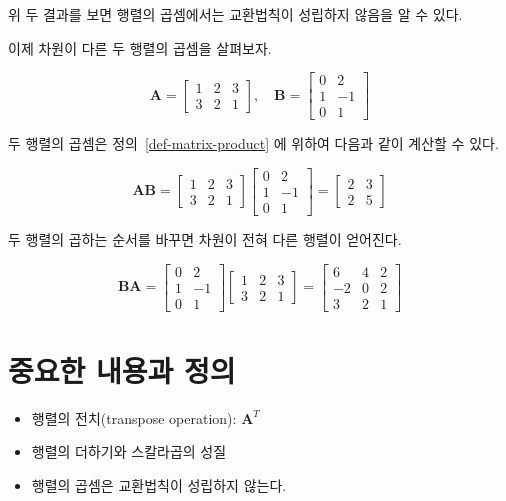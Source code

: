 \documentclass[
  11pt,
  a4paper,
  oneside]{scrbook}
\theoremstyle{definition}
\theoremstyle{definition}
\theoremstyle{plain}
\theoremstyle{remark}
\begin{document}
위 두 결과를 보면 행렬의 곱셈에서는 교환법칙이 성립하지 않음을 알 수
있다.

이제 차원이 다른 두 행렬의 곱셈을 살펴보자.

\[
\pmb A =
\begin{bmatrix}
1 & 2 & 3\\
3 & 2 & 1
\end{bmatrix},
\quad
\pmb B =
\begin{bmatrix}
0 & 2 \\
1 & -1 \\
0 & 1
\end{bmatrix}
\]

두 행렬의 곱셈은 정의~\ref{def-matrix-product} 에 위하여 다음과 같이
계산할 수 있다.

\[
\pmb A \pmb B =
\begin{bmatrix}
1 & 2 & 3\\
3 & 2 & 1
\end{bmatrix}
\begin{bmatrix}
0 & 2 \\
1 & -1 \\
0 & 1
\end{bmatrix}
=
\begin{bmatrix}
2 & 3 \\
2 & 5
\end{bmatrix}
\]

두 행렬의 곱하는 순서를 바꾸면 차원이 전혀 다른 행렬이 얻어진다.

\[
\pmb B \pmb A =
\begin{bmatrix}
0 & 2 \\
1 & -1 \\
0 & 1
\end{bmatrix}
\begin{bmatrix}
1 & 2 & 3\\
3 & 2 & 1
\end{bmatrix}
=
\begin{bmatrix}
6 & 4 & 2 \\
-2 & 0 & 2 \\
3 & 2 & 1
\end{bmatrix}
\]

\section{중요한 내용과
정의}\label{uxc911uxc694uxd55c-uxb0b4uxc6a9uxacfc-uxc815uxc758-1}

\begin{itemize}
\item
  행렬의 전치(transpose operation): \({\pmb A}^T\)
\item
  행렬의 더하기와 스칼라곱의 성질
\item
  행렬의 곱셈은 교환법칙이 성립하지 않는다.
\end{itemize}
\end{document}

